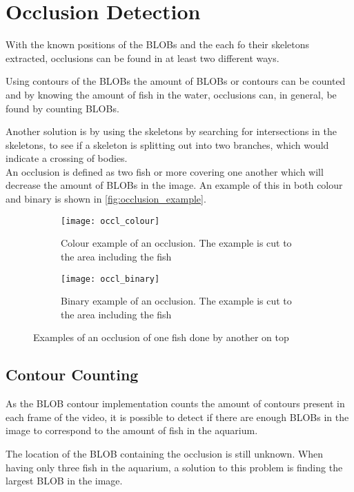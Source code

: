\section{Occlusion Detection}
With the known positions of the BLOBs and the each fo their skeletons extracted, occlusions can be found in at least two different ways.

Using contours of the BLOBs the amount of BLOBs or contours can be counted and by knowing the amount of fish in the water, occlusions can, in general, be found by counting BLOBs.

Another solution is by using the skeletons by searching for intersections in the skeletons, to see if a skeleton is splitting out into two branches, which would indicate a crossing of bodies.\\

An occlusion is defined as two fish or more covering one another which will decrease the amount of BLOBs in the image. An example of this in both colour and binary is shown in \autoref{fig:occlusion_example}.

\begin{figure}[H]
	\centering
	\begin{subfigure}{0.45\textwidth}
		\texttt{[image: occl\_colour]}
		\caption{Colour example of an occlusion. The example is cut to the area including the fish}
		\label{fig:occl_colour}
	\end{subfigure}
	\begin{subfigure}{0.45\textwidth}
		\texttt{[image: occl\_binary]}
		\caption{Binary example of an occlusion. The example is cut to the area including the fish}
		\label{fig:occl_binary}
	\end{subfigure}
\caption{Examples of an occlusion of one fish done by another on top}
\label{fig:occlusion_example}
\end{figure}

\subsection{Contour Counting}
As the BLOB contour implementation counts the amount of contours present in each frame of the video, it is possible to detect if there are enough BLOBs in the image to correspond to the amount of fish in the aquarium.

The location of the BLOB containing the occlusion is still unknown. When having only three fish in the aquarium, a solution to this problem is finding the largest BLOB in the image.\\

